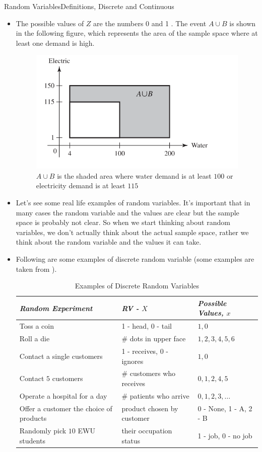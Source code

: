 \documentclass[8pt, usepdftitle=false]{beamer}
\begin{document}
\begin{frame}[allowframebreaks]{Random Variables}{Definitions, Discrete and Continuous}
\begin{itemize}
\item The possible values of $Z$ are the numbers 0 and 1 . The event $A \cup B$ is shown in the following figure, which represents the area of the sample space where at least one demand is high.


\begin{figure}
\includegraphics[scale = .25]{Images/CRV_2.png}
\caption{$A\cup B$ is the shaded area where water demand is at least $100$ or electricity demand is at least $115$}
\end{figure}


\item Let's see some real life examples of random variables. It's important that in many cases the random variable and the values are clear but the sample space is probably not clear. So when we start thinking about random variables, we don't actually think about the actual sample space, rather we think about the random variable and the values it can take. 


\item Following are some examples of discrete random variable  (some examples are taken from \citet*{anderson_statistics_2020}).



\small{
\begin{table}[H]
\begin{tabular}{l|l|l} 
\emph{Random Experiment} & \emph{RV - $X$} & \emph{Possible Values, $x$ } \\ \hline
Toss a coin & 1 - head, 0 - tail & $1, 0$  \\
Roll a die & \# dots in upper face & $1,2,3,4,5,6$ \\
Contact a single customers & 1 - receives, 0 - ignores & $1,0$ \\
Contact $5$ customers & \# customers who receives & $0,1,2,4,5$ \\
Operate a hospital for a day & \# patients who arrive & $0,1,2,3, \ldots$ \\
Offer a customer the choice of  products & product chosen by customer & 
0 - None, 1 - A, 2 - B \\
Randomly pick $10$ EWU students & their occupation status & 1 - job, 0 - no job
\end{tabular} 
\caption{Examples of Discrete Random Variables}		
\end{table}
}


\end{itemize}
\end{frame}
\end{document}
